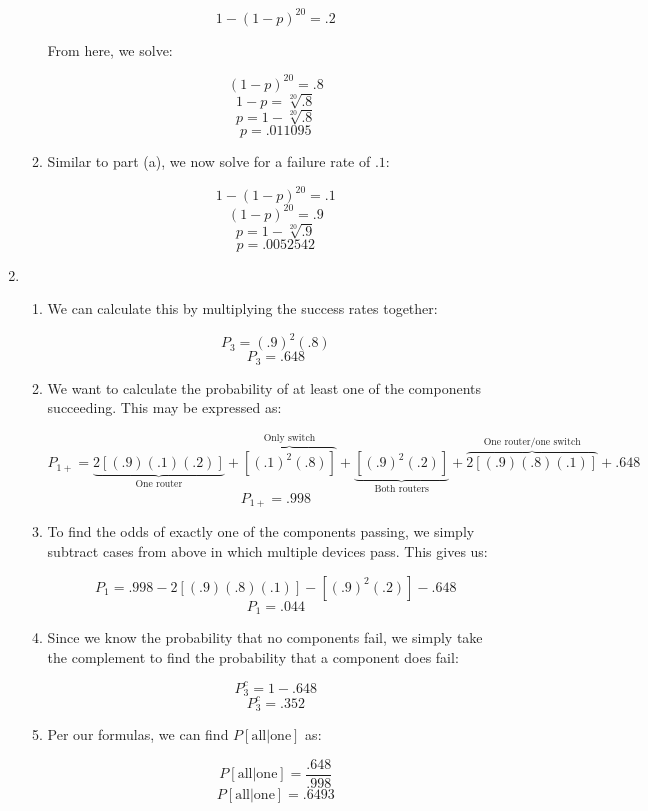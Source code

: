 \begin{enumerate}
\begin{enumerate}
        $$1-(1-p)^{20}=.2$$

        From here, we solve:

        $$(1-p)^{20}=.8$$
        $$1-p=\sqrt[20]{.8}$$
        $$p=1-\sqrt[20]{.8}$$
        $$\boxed{p=.011095}$$

      \item Similar to part (a), we now solve for a failure rate of $.1$:

        $$1-(1-p)^{20}=.1$$
        $$(1-p)^{20}=.9$$
        $$p=1-\sqrt[20]{.9}$$
        $$\boxed{p=.0052542}$$

    \end{enumerate}

    \setcounter{enumi}{3}

  \item

    \begin{enumerate}

      \item We can calculate this by multiplying the success rates together:

        $$P_3=(.9)^2(.8)$$
        $$\boxed{P_3=.648}$$

      \item We want to calculate the probability of at least one of the components succeeding. This may be expressed as:

        $$P_{1+}=\underbrace{2[(.9)(.1)(.2)]}_{\text{One router}}+\overbrace{[(.1)^2(.8)]}^{\text{Only switch}}+\underbrace{[(.9)^2(.2)]}_{\text{Both routers}}+\overbrace{2[(.9)(.8)(.1)]}^{\text{One router/one switch}}+.648$$
        $$\boxed{P_{1+}=.998}$$

      \item To find the odds of exactly one of the components passing, we simply subtract cases from above in which multiple devices pass. This gives us:

        $$P_{1}=.998-2[(.9)(.8)(.1)]-[(.9)^2(.2)]-.648$$
        $$\boxed{P_{1}=.044}$$

      \item Since we know the probability that no components fail, we simply take the complement to find the probability that a component does fail:

        $$P_3^c=1-.648$$
        $$\boxed{P_3^c=.352}$$

      \item Per our formulas, we can find $P[\text{all}|\text{one}]$ as:

        $$P[\text{all}|\text{one}]=\frac{.648}{.998}$$
        $$\boxed{P[\text{all}|\text{one}]=.6493}$$


\end{enumerate}
\end{enumerate}
